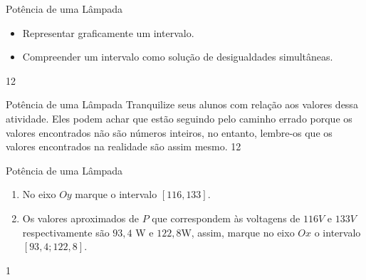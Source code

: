 \def\currentcolor{session2}
\clearmargin
\begin{objectives}{Potência de uma Lâmpada}
{
\begin{itemize}
\item Representar graficamente um intervalo.
\item Compreender um intervalo como solução de desigualdades simultâneas.
\end{itemize}
}{1}{2}
\end{objectives}
\begin{sugestions}{Potência de uma Lâmpada}
{
Tranquilize seus alunos com relação aos valores dessa atividade. Eles podem achar que estão seguindo pelo caminho errado porque os valores encontrados não são números inteiros, no entanto, lembre-os que os valores encontrados na realidade são assim mesmo.
}{1}{2}
\end{sugestions}
\clearmargin
\begin{answer}{Potência de uma Lâmpada}
{
\begin{enumerate}
\item No eixo $Oy$ marque o intervalo $[116,133]$.
\item  Os valores aproximados de $P$ que correspondem às voltagens de $116V$ e $133V$ respectivamente são $93{,}4$ W e $122{,}8$W, assim, marque no eixo $Ox$  o intervalo $[93{,}4;122{,}8]$.
\end{enumerate}
}{1}
\end{answer}
\def\currentcolor{session4}
